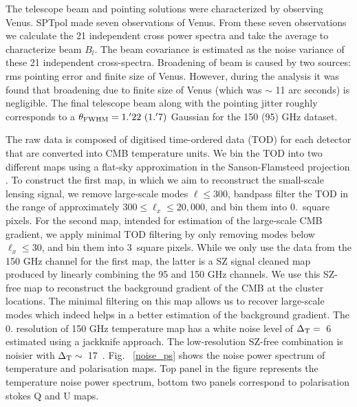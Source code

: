 The telescope beam and pointing solutions were characterized by observing Venus.
  SPTpol made seven observations of Venus. From these seven observations we calculate the 21 independent cross power spectra and take the average to  characterize beam $B_{l}$.
 The beam covariance is estimated as the noise variance of these 21 independent cross-spectra. 
 Broadening of beam is caused by two sources: rms pointing error and finite size of Venus.
 However, during the analysis it was found that broadening due to finite size of Venus (which was $\sim$ 11 arc seconds) is negligible.
The final telescope beam along with the pointing jitter roughly corresponds to a $\theta_{\rm FWHM} = 1.^{\prime}22\ (1.^{\prime}7)$ Gaussian for the 150 (95) GHz dataset.

The raw data is composed of digitised time-ordered data (TOD) for each detector that are converted into CMB temperature units. %
We bin the TOD into two different maps using a flat-sky approximation in the Sanson-Flamsteed projection \citep{calabretta02, schaffer11}. 
To construct the first map, in which we aim to reconstruct the small-scale lensing signal, we remove large-scale modes $\ell \le 300$, bandpass filter the TOD in the range of approximately $300 \le \ell_{x} \le 20,000$, and bin them into 0.\ square pixels.
For the second map, intended for estimation of the large-scale CMB gradient, we apply minimal TOD filtering by only removing modes below $\ell_{x} \le 30$, and bin them into 3\am\ square pixels.
While we only use the data from the 150 GHz channel for the first map, the latter is a SZ signal cleaned map produced by linearly combining the 95 and 150 GHz channels. 
We use this SZ-free map to reconstruct the background gradient of the CMB at the cluster locations.
The minimal filtering on this map allows us to recover large-scale modes which indeed helps in a better estimation of the background gradient.
The 0. resolution of 150 GHz temperature map has a white noise level of \mbox{$\Delta_{\rm T} = $ 6 \ukam} estimated using a jackknife approach. %
The low-resolution SZ-free combination is noisier with \mbox{$\Delta_{\rm T} \sim $ 17 \ukam}.
Fig. ~\ref{noise_ps} shows the noise power spectrum of temperature and polarisation maps. 
Top panel in the figure represents the temperature noise power spectrum, bottom two panels correspond to polarisation stokes Q and U maps. 

